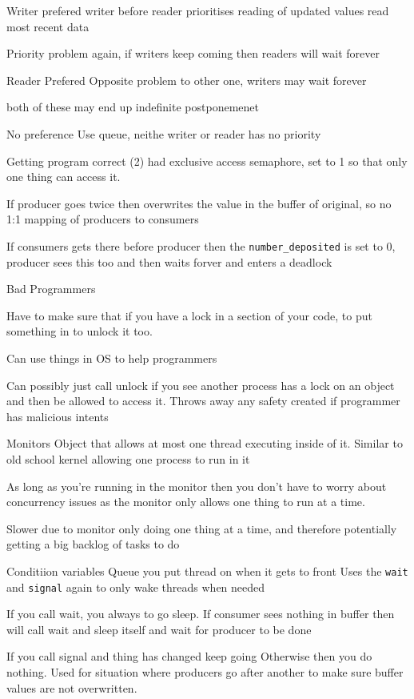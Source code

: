 \documentclass{article}
\begin{document}
		Writer prefered
			writer before reader
			prioritises reading of updated values
			read most recent data

			Priority problem again, if writers keep coming then readers will wait forever

		Reader Prefered
			Opposite problem to other one, writers may wait forever

		both of these may end up indefinite postponemenet

		No preference
			Use queue, neithe writer or reader has no priority

	Getting program correct
		(2) had exclusive access semaphore, set to 1 so that only one thing can access it.

		If producer goes twice then overwrites the value in the buffer of original, so no 1:1 mapping of producers to consumers

		If consumers gets there before producer then the \texttt{number\_deposited} is set to 0, producer sees this too and then waits forver and enters a deadlock

	Bad Programmers

		Have to make sure that if you have a lock in a section of your code, to put something in to unlock it too.
			
		Can use things in OS to help programmers

		Can possibly just call unlock if you see another process has a lock on an object and then be allowed to access it. Throws away any safety created if programmer has malicious intents

	Monitors
		Object that allows at most one thread executing inside of it.
		Similar to old school kernel allowing one process to run in it

		As long as you're running in the monitor then you don't have to worry about concurrency issues as the monitor only allows one thing to run at a time.

		Slower due to monitor only doing one thing at a time, and therefore potentially getting a big backlog of tasks to do

	Conditiion variables
		Queue you put thread on when it gets to front
		Uses the \texttt{wait} and \texttt{signal} again to only wake threads when needed

		If you call wait, you always to go sleep.
			If consumer sees nothing in buffer then will call wait and sleep itself and wait for producer to be done

		If you call signal and thing has changed keep going
		Otherwise then you do nothing. Used for situation where producers go after another to make sure buffer values are not overwritten.
\end{document}
